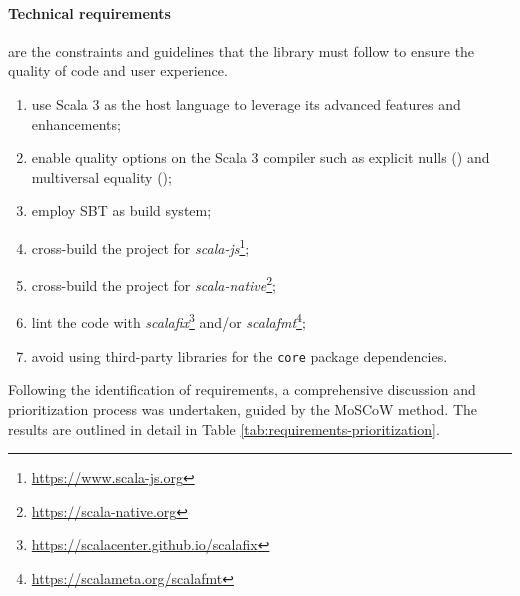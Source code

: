 \paragraph{Technical requirements} are the constraints and guidelines that the library must follow to ensure the quality of code and user experience.
\begin{enumerate}[label=\textbf{T.\arabic*}]
    \item use Scala 3 as the host language to leverage its advanced features and enhancements;
    \item enable quality options on the Scala 3 compiler such as explicit nulls () and multiversal equality ();
    \item employ \ac{SBT} as build system;
    \item cross-build the project for \textit{scala-js}\footnote{\url{https://www.scala-js.org}};
    \item cross-build the project for \textit{scala-native}\footnote{\url{https://scala-native.org}};
    \item lint the code with \textit{scalafix}\footnote{\url{https://scalacenter.github.io/scalafix}} and/or \textit{scalafmt}\footnote{\url{https://scalameta.org/scalafmt}};
    \item avoid using third-party libraries for the \texttt{core} package dependencies.
\end{enumerate}

Following the identification of requirements, a comprehensive discussion and prioritization process was undertaken, guided by the \ac{MoSCoW} method.
%
The results are outlined in detail in Table \ref{tab:requirements-prioritization}.

